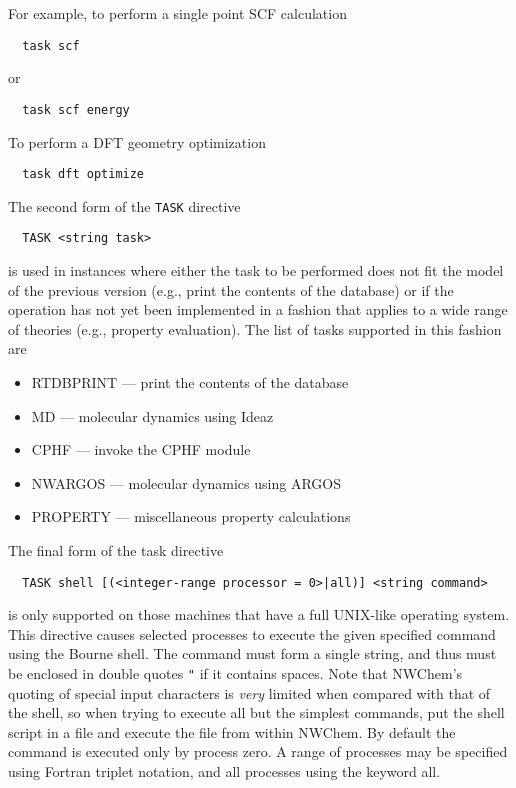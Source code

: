 For example, to perform a single point SCF calculation
\begin{verbatim}
  task scf
\end{verbatim}
or
\begin{verbatim}
  task scf energy
\end{verbatim}
To perform a DFT geometry optimization
\begin{verbatim}
  task dft optimize
\end{verbatim}

The second form of the \verb+TASK+ directive
\begin{verbatim}
  TASK <string task>
\end{verbatim}
is used in instances where either the task to be performed does not
fit the model of the previous version (e.g., print the contents of the
database) or if the operation has not yet been implemented in a
fashion that applies to a wide range of theories (e.g., property
evaluation).  The list of tasks supported in this fashion are
\begin{itemize}
  \item RTDBPRINT --- print the contents of the database
  \item MD --- molecular dynamics using Ideaz
  \item CPHF --- invoke the CPHF module
  \item NWARGOS --- molecular dynamics using ARGOS
  \item PROPERTY --- miscellaneous property calculations
\end{itemize}

The final form of the task directive
\begin{verbatim}
  TASK shell [(<integer-range processor = 0>|all)] <string command>
\end{verbatim}
is only supported on those machines that have a full UNIX-like
operating system.  This directive causes selected processes to execute
the given specified command using the Bourne shell.  The command must
form a single string, and thus must be enclosed in double quotes
\verb+"+ if it contains spaces.  Note that NWChem's quoting of
special input characters is {\em very} limited when compared with that
of the shell, so when trying to execute all but the simplest commands,
put the shell script in a file and execute the file from within
NWChem.  By default the command is executed only by process zero.  A
range of processes may be specified using Fortran triplet notation,
and all processes using the keyword all.

